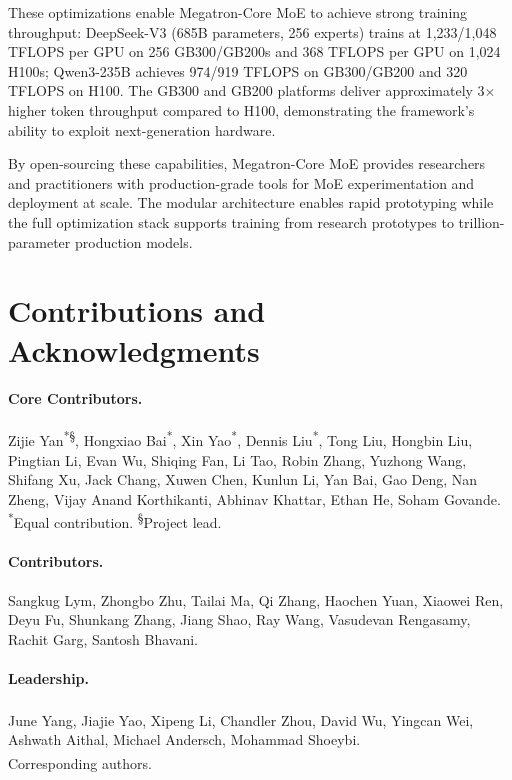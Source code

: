 \documentclass[10pt,logo,copyright]{nvidiatechreport}
\begin{document}
These optimizations enable Megatron-Core MoE to achieve strong training throughput: DeepSeek-V3 (685B parameters, 256 experts) trains at 1,233/1,048 TFLOPS per GPU on 256 GB300/GB200s and 368 TFLOPS per GPU on 1,024 H100s; Qwen3-235B achieves 974/919 TFLOPS on GB300/GB200 and 320 TFLOPS on H100. The GB300 and GB200 platforms deliver approximately 3$\times$ higher token throughput compared to H100, demonstrating the framework's ability to exploit next-generation hardware.

By open-sourcing these capabilities, Megatron-Core MoE provides researchers and practitioners with production-grade tools for MoE experimentation and deployment at scale. The modular architecture enables rapid prototyping while the full optimization stack supports training from research prototypes to trillion-parameter production models.


\section*{Contributions and Acknowledgments}
\label{sec:contributions}


\paragraph{Core Contributors.}
Zijie Yan\textsuperscript{*\S}, Hongxiao Bai\textsuperscript{*}, Xin Yao\textsuperscript{*}, Dennis Liu\textsuperscript{*}, Tong Liu, Hongbin Liu, Pingtian Li, Evan Wu, Shiqing Fan, Li Tao, Robin Zhang, Yuzhong Wang, Shifang Xu, Jack Chang, Xuwen Chen, Kunlun Li, Yan Bai, Gao Deng, Nan Zheng, Vijay Anand Korthikanti, Abhinav Khattar, Ethan He, Soham Govande.\\
{\small \textsuperscript{*}Equal contribution. \textsuperscript{\S}Project lead.}

\paragraph{Contributors.}
Sangkug Lym, Zhongbo Zhu, Tailai Ma, Qi Zhang, Haochen Yuan, Xiaowei Ren, Deyu Fu, Shunkang Zhang, Jiang Shao, Ray Wang, Vasudevan Rengasamy, Rachit Garg, Santosh Bhavani.

\paragraph{Leadership.}
June Yang\textsuperscript{\dag}, Jiajie Yao\textsuperscript{\dag}, Xipeng Li, Chandler Zhou, David Wu, Yingcan Wei, Ashwath Aithal, Michael Andersch, Mohammad Shoeybi.\\
{\small \textsuperscript{\dag}Corresponding authors.}
\end{document}
